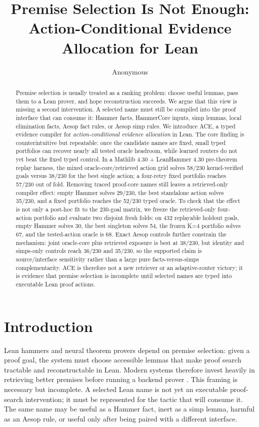 \documentclass{article}
\title{Premise Selection Is Not Enough: Action-Conditional Evidence Allocation for Lean}
\author{Anonymous}
\newcommand{\tap}{\textsc{ACE}}
\begin{document}
\maketitle

\begin{abstract}
Premise selection is usually treated as a ranking problem: choose useful lemmas, pass them to a Lean prover, and hope reconstruction succeeds. We argue that this view is missing a second intervention. A selected name must still be compiled into the proof interface that can consume it: Hammer facts, HammerCore inputs, simp lemmas, local elimination facts, Aesop fact rules, or Aesop simp rules. We introduce \tap, a typed evidence compiler for \emph{action-conditional evidence allocation} in Lean. The core finding is counterintuitive but repeatable: once the candidate names are fixed, small typed portfolios can recover nearly all tested oracle headroom, while learned routers do not yet beat the fixed typed control. In a Mathlib 4.30 + LeanHammer 4.30 pre-theorem replay harness, the mixed oracle-core/retrieved action grid solves 58/230 kernel-verified goals versus 38/230 for the best single action; a four-retry fixed portfolio reaches 57/230 out of fold. Removing traced proof-core names still leaves a retrieved-only compiler effect: empty Hammer solves 29/230, the best standalone action solves 35/230, and a fixed portfolio reaches the 52/230 typed oracle. To check that the effect is not only a post-hoc fit to the 230-goal matrix, we freeze the retrieved-only four-action portfolio and evaluate two disjoint fresh folds: on 432 replayable holdout goals, empty Hammer solves 30, the best singleton solves 54, the frozen K=4 portfolio solves 67, and the tested-action oracle is 68. Exact Aesop controls further constrain the mechanism: joint oracle-core plus retrieved exposure is best at 38/230, but identity and simps-only controls reach 36/230 and 35/230, so the supported claim is source/interface sensitivity rather than a large pure facts-versus-simps complementarity. \tap{} is therefore not a new retriever or an adaptive-router victory; it is evidence that premise selection is incomplete until selected names are typed into executable Lean proof actions.
\end{abstract}

\section{Introduction}

Lean hammers and neural theorem provers depend on premise selection: given a proof goal, the system must choose accessible lemmas that make proof search tractable and reconstructable in Lean. Modern systems therefore invest heavily in retrieving better premises before running a backend prover \citep{yang2023leandojo,zhu2025premise,gao2026leansearch}. This framing is necessary but incomplete. A selected Lean name is not yet an executable proof-search intervention; it must be represented for the tactic that will consume it. The same name may be useful as a Hammer fact, inert as a simp lemma, harmful as an Aesop rule, or useful only after being paired with a different interface.
\end{document}
